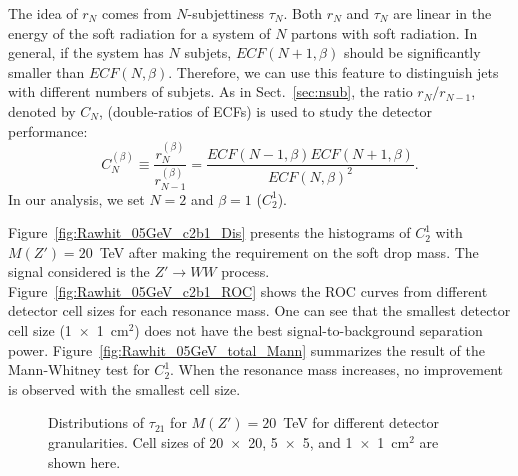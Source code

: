 The idea of $r_N$ comes from $N$-subjettiness $\tau_N$. Both $r_N$ and $\tau_N$ 
are linear in the energy of the soft radiation for a system of $N$ partons 
with soft radiation. In general, if the system has $N$ subjets, $ECF(N+1,\beta)$ 
should be significantly smaller than $ECF(N,\beta)$. Therefore, we can use this
 feature to distinguish jets with different numbers  of subjets. 
As in Sect.~\ref{sec:nsub}, the ratio $r_N/r_{N-1}$, denoted by $C_N$, 
(double-ratios of ECFs) is used to study the detector performance: 
\begin{equation}
C_{N}^{(\beta)}\equiv\frac{r_{N}^{(\beta)}}{r_{N-1}^{(\beta)}}=\frac{ECF(N-1,\beta)ECF(N+1,\beta)}{ECF(N,\beta)^2}.
\end{equation}
In our analysis, we set $N=2$ and $\beta=1$ ($C_2^1$).

Figure~\ref{fig:Rawhit_05GeV_c2b1_Dis} presents the histograms of $C_{2}^{1}$ 
with $M(Z')=20$~TeV after making the requirement on the soft drop mass. 
The signal considered is the $Z' \rightarrow WW$ process. 
Figure~\ref{fig:Rawhit_05GeV_c2b1_ROC} shows the ROC curves from different 
detector cell sizes for each resonance mass. One can see that 
the smallest detector cell size (1~$\times$~1~$\mathrm{cm}^2$) does not have the 
best signal-to-background separation power. 
Figure~\ref{fig:Rawhit_05GeV_total_Mann} summarizes the result of 
the Mann-Whitney test for $C_{2}^{1}$. When the resonance mass increases, 
no improvement is observed with the smallest cell size. 


\begin{figure}
\begin{center}
\end{center}
\caption{Distributions of $\tau_{21}$ for $M(Z') = 20$~TeV for different 
detector granularities. Cell sizes of 20~$\times$~20, 5~$\times$~5, and 1~$\times$~1~cm$^2$ 
are shown here. \label{fig:Rawhit_05GeV_tau21_Dis}}
\end{figure}

